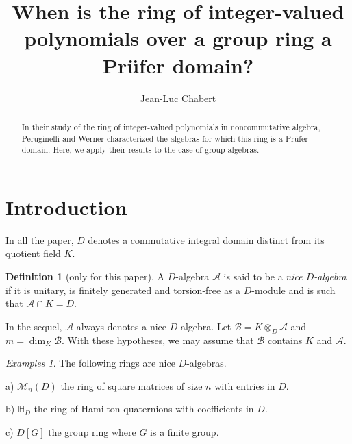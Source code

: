 \documentclass{amsart}
\newtheorem{first argument}[lemma]{First Argument}
\theoremstyle{definition}
\newtheorem{definition}[lemma]{Definition}
\theoremstyle{definitions}
\theoremstyle{remark}
\newtheorem{examples}[lemma]{Examples}
\theoremstyle{remark}
\def\SH{\mathbb H}    %
\def\Aa{{\mathcal A}}           %
\def\Bb{{\mathcal B}}           %
\def\Mm{{\mathcal M}}
\begin{document}
\title[Group rings and Pr\"ufer]{When is the ring of integer-valued polynomials over a group ring a Pr\"ufer domain?}

\begin{abstract}
In their study of the ring of integer-valued polynomials in noncommutative algebra, Peruginelli and Werner characterized the algebras for which this ring is a Pr\"ufer domain. Here, we apply their results to the case of group algebras.
\end{abstract}	


\author{Jean-Luc Chabert}
\address{Facult\'e des Sciences\\
Universit\'e de Picardie\\
80039 Amiens, France\\
LAMFA CNRS-UMR 7352}



\maketitle



\section{Introduction}

In all the paper, $D$ denotes a commutative integral domain distinct from its quotient field $K$.

\begin{definition}[only for this paper]
A $D$-algebra $\Aa$ is said to be a {\em nice $D$-algebra} if it is unitary, is finitely generated and torsion-free as a $D$-module and is such that $\Aa\cap K=D$.
\end{definition}

In the sequel, $\Aa$ always denotes a nice $D$-algebra. Let $\Bb=K\otimes_D\Aa$ and $m=\dim_K \Bb$. With these hypotheses, we may assume that $\Bb$ contains $K$ and $\Aa$.

\begin{examples} The following rings are nice $D$-algebras.

a) $\Mm_n(D)$ the ring of square matrices of size $n$ with entries in $D$.

b) $\SH_D$ the ring of Hamilton quaternions with coefficients in $D$.

c) $D[G]$ the group ring where $G$ is a finite group.	
\end{examples}
\end{document}
